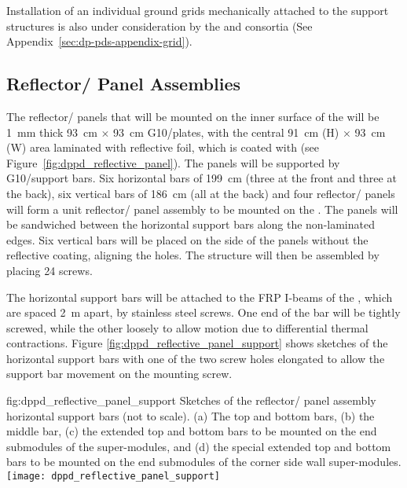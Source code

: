 Installation of an individual ground grids mechanically attached to the  support structures is also under consideration by the  and \dual {} consortia (See Appendix~\ref{sec:dp-pds-appendix-grid}).


\subsection{Reflector/ Panel Assemblies}
\label{subsec:dp-pds-mechanics-reflectors}

The reflector/ panels that will be mounted on the inner surface of the  will be \SI{1}{\mm} thick \SI{93}{\cm} $\times$ \SI{93}{\cm} G10/\frfour plates, with the central \SI{91}{\cm} (H) $\times$ \SI{93}{\cm} (W) area laminated with reflective foil, which is coated with  (see Figure~\ref{fig:dppd_reflective_panel}). The panels will be supported by G10/\frfour support bars. Six horizontal bars of \SI{199}{\cm} (three at the front and three at the back), six vertical bars of \SI{186}{\cm} (all at the back) and four reflector/ panels will form a unit reflector/ panel assembly to be mounted on the . The panels will be sandwiched between the horizontal support bars along the non-laminated edges. Six vertical bars will be placed on the side of the panels without the reflective coating, aligning the holes. The structure will then be assembled by placing \num{24} screws.

The horizontal support bars will be attached to the FRP I-beams of the , which are spaced \SI{2}{\m} apart, by stainless steel screws. One end of the bar will be tightly screwed, while the other loosely to allow motion due to differential thermal contractions. Figure \ref{fig:dppd_reflective_panel_support} shows sketches of the horizontal support bars with one of the two screw holes elongated to allow the support bar movement on the mounting screw.

\begin{dunefigure}{fig:dppd_reflective_panel_support}
{Sketches of the reflector/ panel assembly horizontal support bars (not to scale). (a) The top and bottom bars, (b) the middle bar, (c) the extended top and bottom bars to be mounted on the end submodules of the  super-modules, and (d) the special extended top and bottom bars to be mounted on the end submodules of the corner  side wall super-modules.}
\texttt{[image: dppd\_reflective\_panel\_support]}
\end{dunefigure}

